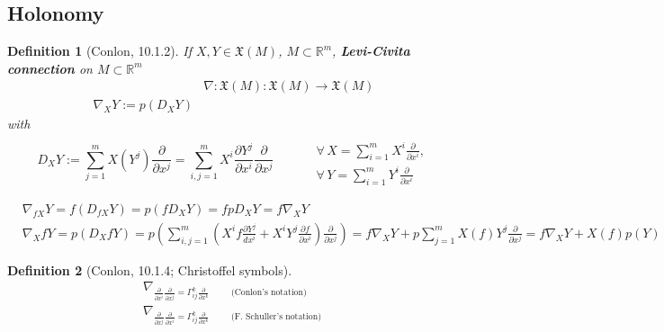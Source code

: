 \documentclass[10pt]{amsart}
\newtheorem{definition}{Definition}
\begin{document}
\begin{multicols*}{2}
\part{Holonomy}

\begin{definition}[Conlon, 10.1.2] If $X,Y\in \mathfrak{X}(M)$, $M\subset \mathbb{R}^m$, \textbf{Levi-Civita connection} on $M\subset \mathbb{R}^m$
	\begin{equation}
	\begin{aligned}
	& \nabla : \mathfrak{X}(M) : \mathfrak{X}(M) \to \mathfrak{X}(M) \\
	\nabla_XY := p(D_XY)
	\end{aligned}
	\end{equation}
	with 
	\[
	D_XY := \sum_{j=1}^m X(Y^j) \frac{ \partial }{ \partial x^j} = \sum_{i,j=1}^m X^i \frac{ \partial Y^j}{ \partial x^i} \frac{ \partial }{ \partial x^j} \qquad \,  \begin{aligned} & \quad \\ 
		& \forall \, X=\sum_{i=1}^m X^i \frac{ \partial }{ \partial x^i},  \\
		& \forall \, Y=\sum_{i=1}^m Y^i \frac{\partial }{ \partial x^i } \end{aligned}
	\]
\end{definition}

\[
\begin{aligned}
	& \nabla_{fX}Y = f(D_{fX}Y) = p(fD_XY) = fpD_XY = f\nabla_XY \\ 
	&  \nabla_X fY = p(D_XfY) = p \left( \sum_{i,j=1}^m \left( X^i f\frac{ \partial Y^j}{ dx^i } + X^i Y^j \frac{ \partial f}{ \partial x^i} \right) \frac{ \partial }{ \partial x^j} \right) = f\nabla_X Y + p \sum_{j=1}^m X(f) Y^j \frac{ \partial }{ \partial x^j} = f\nabla_XY + X(f) p(Y)
\end{aligned}
\]


\begin{definition}[Conlon, 10.1.4; Christoffel symbols] 
\begin{equation}
\begin{gathered}
	\nabla_{\frac{ \partial }{ \partial x^i} \frac{ \partial }{ \partial x^j} = \Gamma^k_{ij} \frac{ \partial }{ \partial x^k} \qquad \, \text{ (Conlon's notation) }  }   \\
	\nabla_{\frac{ \partial }{ \partial x^j} \frac{ \partial }{ \partial x^i} = \Gamma^k_{ij} \frac{ \partial }{ \partial x^k} \qquad \, \text{ (F. Schuller's notation) }  }
\end{gathered}
\end{equation}
\end{definition}






\end{multicols*}
\end{document}
